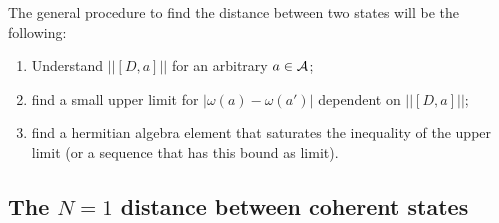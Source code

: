 The general procedure to find the distance between two states will be the following: 

    \begin{enumerate}
    
    \item Understand $||[D, a]||$ for an arbitrary $a \in \mathcal A$; 
    
    \item find a small upper limit for $|\omega(a) - \omega(a')|$ dependent on $||[D, a]||$;
    
    \item find a hermitian algebra element that saturates the inequality of the upper limit (or a sequence that has this bound as limit).
    
    \end{enumerate} 


\subsection{The $N=1$ distance between coherent states}

 
 






